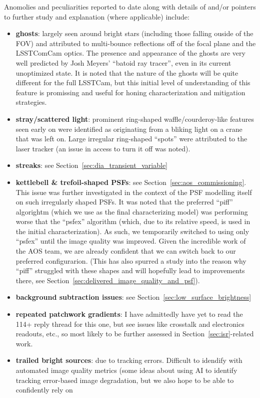 Anomolies and peculiarities reported to date along with details of and/or pointers
to further study and explanation (where applicable) include:
\begin{itemize}

\item \textbf{ghosts}: largely seen around bright stars (including those falling
  ouside of the FOV) and attributed to multi-bounce reflections off of the focal
  plane and the LSSTComCam optics.  The presence and appearance of the ghosts
  are very well predicted by Josh Meyers' ``batoid ray tracer'', even in its
  current unoptimized state.  It is noted that the nature of the ghosts will be
  quite different for the full LSSTCam, but this initial level of understanding
  of this feature is promissing and useful for honing characterization and
  mitigation strategies.

\item \textbf{stray/scattered light}: prominent ring-shaped waffle/courderoy-like
  features seen early on were identified as originating from a bliking light on a
  crane that was left on. Large irregular ring-shaped ``spots'' were attributed to
  the laser tracker (an issue in access to turn it off was noted).

\item \textbf{streaks}: see Section~\ref{sec:dia_transient_variable}

\item \textbf{kettlebell \& trefoil-shaped PSFs}: see Section~\ref{sec:aos_commissioning}.
  This issue was further investigated in the context of the PSF modelling itself on such
  irregularly shaped PSFs.  It was noted that the preferred ``piff'' algorightm (which
  we use as the final characterizing model) was performing worse that the ``psfex''
  algorithm (which, due to its relative speed, is used in the initial characterization).
  As such, we temporarily switched to using only ``psfex'' until the image quality was
  improved.  Given the incredible work of the AOS team, we are already confident that
  we can switch back to our preferred configurarion.  (This has also spurred a study
  into the reason why ``piff'' struggled with these shapes and will hopefully lead to
  improvements there, see Section~\ref{sec:delivered_image_quality_and_psf}).

\item \textbf{background subtraction issues}: see Section~\ref{sec:low_surface_brightness}

\item \textbf{repeated patchwork gradients}: I have admittedly have yet to read the 114+
  reply thread for this one, but see issues like crosstalk and electronics readouts, etc.,
  so most likely to be further assessed in Section~\ref{sec:isr}-related work.

\item \textbf{trailed bright sources}: due to tracking errors.  Difficult to idendify
  with automated image quality metrics (some ideas about using AI to identify tracking
  error-based image degradation, but we also hope to be able to confidently rely on

\end{itemize}

